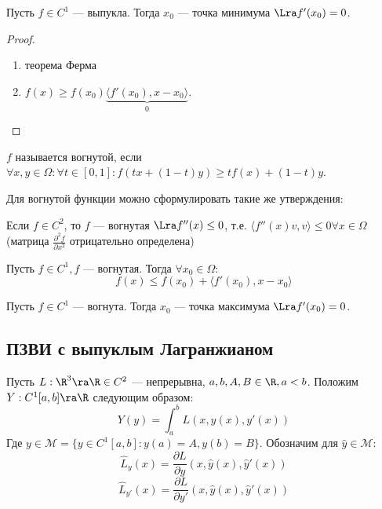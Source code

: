 \begin{theorem}
    Пусть \(f \in C^1\) --- выпукла. Тогда \(x_0\) --- точка минимума \(\Lra f'(x_0) = 0\).
\end{theorem}
\begin{proof}
    \begin{enumerate}
        \item[\(\Ra\)] теорема Ферма
        \item[\(\La\)] \(f(x) \ge f(x_0) \underbrace{\langle f'(x_0), x - x_0 \rangle}_0\).
    \end{enumerate}
\end{proof}

\begin{definition}
    \(f\) называется вогнутой, если \(\forall x, y \in \Omega: \forall t \in [0, 1]: f(tx + (1 - t)y) \ge tf(x) + (1 - t)y\).
\end{definition}

\begin{note}
    Для вогнутой функции можно сформулировать такие же утверждения:
\end{note}

\begin{theorem}
    Если \(f \in C^2\), то \(f\) --- вогнутая \(\Lra f''(x) \le 0\), т.е. \(\langle f''(x)v, v \rangle \le 0 \forall x \in \Omega\) (матрица \(\frac{\partial^2f}{\partial x^2}\) отрицательно определена)
\end{theorem}

\begin{theorem}
    Пусть \(f \in C^1, f\) --- вогнутая. Тогда \(\forall x_0 \in \Omega\):
    \[f(x) \le f(x_0) + \langle f'(x_0), x - x_0 \rangle\]
\end{theorem}

\begin{theorem}
    Пусть \(f \in C^1\) --- вогнута. Тогда \(x_0\) --- точка максимума \(\Lra f'(x_0) = 0\).
\end{theorem}

\subsection{ПЗВИ с выпуклым Лагранжианом}
Пусть \(L: \R^3 \ra \R \in C^2\) --- непрерывна, \(a, b, A, B \in \R, a < b\). Положим \(Y: C^1[a, b] \ra \R\) следующим образом:
\[Y(y) = \int_a^b L(x, y(x), y'(x))\]
Где \(y \in \mathcal{M} = \{y \in C^1[a, b]: y(a) = A, y(b) = B\}\). Обозначим для \(\widehat{y} \in \mathcal{M}\):
\[\widehat{L}_{y}(x) = \frac{\partial L}{\partial y}(x, \widehat{y}(x), \widehat{y}'(x))\]
\[\widehat{L}_{y'}(x) = \frac{\partial L}{\partial y'}(x, \widehat{y}(x), \widehat{y}'(x))\]

